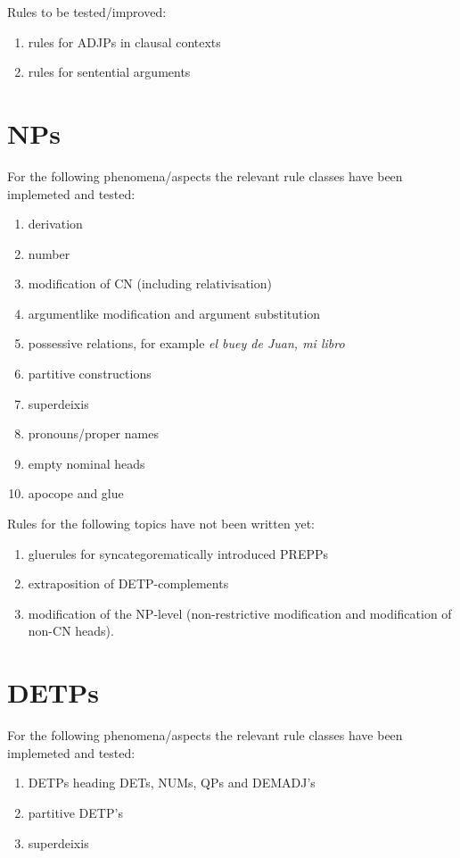 Rules to be tested/improved:
\begin{enumerate}
  \item rules for ADJPs in clausal contexts
  \item rules for sentential arguments
\end{enumerate}

\section{NPs}

For the following phenomena/aspects the relevant 
rule classes have been implemeted and tested:
\begin{enumerate}
  \item derivation
  \item number
  \item modification of CN (including relativisation)
  \item argumentlike modification and argument substitution
  \item possessive relations, for example {\em el buey de Juan, mi libro}
  \item partitive constructions
  \item superdeixis
  \item pronouns/proper names
  \item empty nominal heads
  \item apocope and glue  
\end{enumerate}

Rules for the following topics have not been written yet:
\begin{enumerate}
  \item gluerules for syncategorematically introduced PREPPs
  \item extraposition of DETP-complements
  \item modification of the NP-level (non-restrictive modification and 
        modification of non-CN heads).
\end{enumerate}

\section{DETPs}
For the following phenomena/aspects the relevant 
rule classes have been implemeted and tested:
\begin{enumerate}
  \item DETPs heading DETs, NUMs, QPs and DEMADJ's
  \item partitive DETP's
  \item superdeixis
\end{enumerate}
\mbox{}\\


